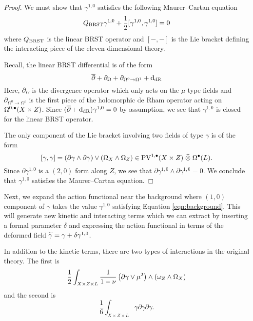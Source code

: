 \documentclass[11pt]{amsart}
\begin{document}
\begin{proof}
  We must show that $\gamma^{1,0}$ satisfies the following Maurer--Cartan equation
  \[
    Q_{\rm BRST} \gamma^{1,0} + \frac12 [\gamma^{1,0} ,\gamma^{1,0}] = 0
  \]
  where $Q_{\rm BRST}$ is the linear BRST operator and $[-,-]$ is the Lie bracket defining the interacting piece of the eleven-dimensional theory.

Recall, the linear BRST differential is of the form
  \[
    \dbar + \partial_{\Omega} + \partial_{\Omega^0 \to \Omega^1} + \d_{\rm dR}
  \]
  Here, $\partial_\Omega$ is the divergence operator which only acts on the $\mu$-type fields and $\partial_{\Omega^0 \to \Omega^1}$ is the first piece of the holomorphic de Rham operator acting on $\Omega^{0,\bu}(X \times Z)$.
  Since $(\dbar + \d_{\rm dR}) \gamma^{1,0} = 0$ by assumption, we see that $\gamma^{1,0}$ is closed for the linear BRST operator.

The only component of the Lie bracket involving two fields of type $\gamma$ is of the form
  \[
    [\gamma, \gamma] = (\partial \gamma \wedge \partial \gamma) \vee (\Omega_X \wedge \Omega_Z) \in \PV^{1,\bu}(X \times Z) \; \Hat{\otimes} \; \Omega^\bu(L) .
  \]
  Since $\partial \gamma^{1,0}$ is a $(2,0)$ form along $Z$, we see that $\partial \gamma^{1,0} \wedge \partial \gamma^{1,0} =0$.
  We conclude that $\gamma^{1,0}$ satisfies the Maurer--Cartan equation.
\end{proof}

Next, we expand the action functional near the background where $(1,0)$ component of $\gamma$ takes the value $\gamma^{1,0}$ satisfying Equation \eqref{eqn:background}.
This will generate new kinetic and interacting terms which we can extract by inserting a formal parameter $\delta$ and expressing the action functional in terms of the deformed field $\Tilde{\gamma} = \gamma + \delta \gamma^{1,0}$.

In addition to the kinetic terms, there are two types of interactions in the original theory.
The first is
\begin{equation}\label{eqn:int1}
  \frac12 \int_{X\times Z \times L} \frac{1}{1-\nu} \left(\del \gamma \vee \mu^2 \right) \wedge (\omega_Z \wedge \Omega_X)
\end{equation}
and the second is
\begin{equation} \label{eqn:int2}
  \frac16\int_{X \times Z \times L} \gamma \partial \gamma \partial \gamma .
\end{equation}
\end{document}
